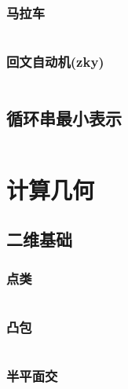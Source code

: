 \documentclass[landscape, oneside, a4paper, cs4size]{book}
\newcommand{\cppcode}[1]{
	\inputminted[mathescape,
	frame=lines,linenos]{cpp}{source/#1}
}
\begin{document}
\begin{multicols}{2}
\begin{spacing}{0.8}
\subsubsection{马拉车}

\cppcode{string-manipulation/Manacher.cpp}



\subsubsection{回文自动机(zky)}

\cppcode{string-manipulation/PAM.cpp}





\subsection{循环串最小表示}

\cppcode{string-manipulation/minexpress.cpp}


\section{计算几何}


\subsection{二维基础}


\subsubsection{点类}


\cppcode{computational-geometry/point.cpp}


\subsubsection{凸包}


\cppcode{computational-geometry/convex-hull.cpp}


\subsubsection{半平面交}


\end{spacing}
\end{multicols}
\end{document}
